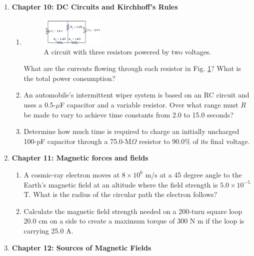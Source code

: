\documentclass[10pt]{article}
\begin{document}
\begin{enumerate}
\item \textbf{Chapter 10: DC Circuits and Kirchhoff's Rules}
\begin{enumerate}
\item 
\begin{figure}[ht]
\centering
\includegraphics[width=0.3\textwidth]{circuit1.png}
\caption{\label{fig:circuit1} A circuit with three resistors powered by two voltages.}
\end{figure}
What are the currents flowing through each resistor in Fig. \ref{fig:circuit1}?  What is the total power consumption? \\ \vspace{3cm}
\item  An automobile’s intermittent wiper system is based on an RC circuit and uses a 0.5-$\mu$F capacitor and a variable resistor. Over what range must $R$ be made to vary to achieve time constants from 2.0 to 15.0 seconds? \\ \vspace{1cm}
\item Determine how much time is required to charge an initially uncharged 100-pF capacitor through a 75.0-M$\Omega$ resistor to 90.0\% of its final voltage. \\ \vspace{3cm}
\end{enumerate}
\item \textbf{Chapter 11: Magnetic forces and fields}
\begin{enumerate}
\item A cosmic-ray electron moves at $8 \times 10^6$ m/s at a 45 degree angle to the Earth’s magnetic field at an altitude where the field strength is $5.0 \times 10^{-5}$ T. What is the radius of the circular path the electron follows? \\ \vspace{1.5 cm}
\item Calculate the magnetic field strength needed on a 200-turn square loop 20.0 cm on a side to create a maximum torque of 300 N m if the loop is carrying 25.0 A. \\ \vspace{2cm}
\end{enumerate}
\item \textbf{Chapter 12: Sources of Magnetic Fields}

\end{enumerate}
\end{document}
